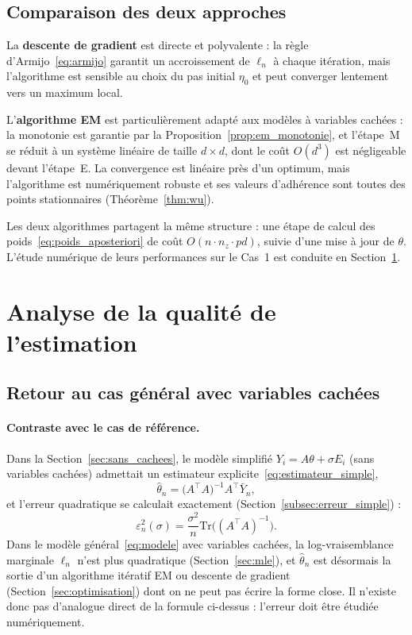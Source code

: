 \documentclass[12pt, a4paper]{article}
\theoremstyle{definition}
\newcommand{\Tr}{\mathrm{Tr}}
\begin{document}
\subsection{Comparaison des deux approches}
\label{subsec:comparaison}

La \textbf{descente de gradient} est directe et polyvalente : la règle d'Armijo~\eqref{eq:armijo} garantit un accroissement de $\ell_n$ à chaque itération, mais l'algorithme est sensible au choix du pas initial $\eta_0$ et peut converger lentement vers un maximum local.

L'\textbf{algorithme EM} est particulièrement adapté aux modèles à variables cachées : la monotonie est garantie par la Proposition~\ref{prop:em_monotonie}, et l'étape~M se réduit à un système linéaire de taille $d \times d$, dont le coût $O(d^3)$ est négligeable devant l'étape~E. La convergence est linéaire près d'un optimum, mais l'algorithme est numériquement robuste et ses valeurs d'adhérence sont toutes des points stationnaires (Théorème~\ref{thm:wu}).

Les deux algorithmes partagent la même structure : une étape de calcul des poids~\eqref{eq:poids_aposteriori} de coût $O(n \cdot n_z \cdot pd)$, suivie d'une mise à jour de $\theta$. L'étude numérique de leurs performances sur le Cas~1 est conduite en Section~\ref{sec:analyse_erreur}.




% 
\newpage
\section{Analyse de la qualité de l'estimation}
\label{sec:analyse_erreur}

\subsection{Retour au cas général avec variables cachées}
\label{subsec:avec_variables_cachees}

\paragraph{Contraste avec le cas de référence.}
Dans la Section~\ref{sec:sans_cachees}, le modèle simplifié $Y_i = A\theta + \sigma E_i$ (sans
variables cachées) admettait un estimateur explicite~\eqref{eq:estimateur_simple},
\[
    \hat{\theta}_n = \bigl(A^\top A\bigr)^{-1}A^\top\bar{Y}_n,
\]
et l'erreur quadratique se calculait exactement (Section~\ref{subsec:erreur_simple}) :
\[
    \varepsilon_n^2(\sigma) = \frac{\sigma^2}{n}\Tr\!\bigl((A^\top A)^{-1}\bigr).
\]
Dans le modèle général~\eqref{eq:modele} avec variables cachées, la log-vraisemblance
marginale $\ell_n$ n'est plus quadratique (Section~\ref{sec:mle}), et $\hat\theta_n$
est désormais la sortie d'un algorithme itératif EM ou descente de gradient
(Section~\ref{sec:optimisation}) dont on ne peut pas écrire la forme close.
Il n'existe donc pas d'analogue direct de la formule ci-dessus : l'erreur doit
être étudiée numériquement.
\end{document}
